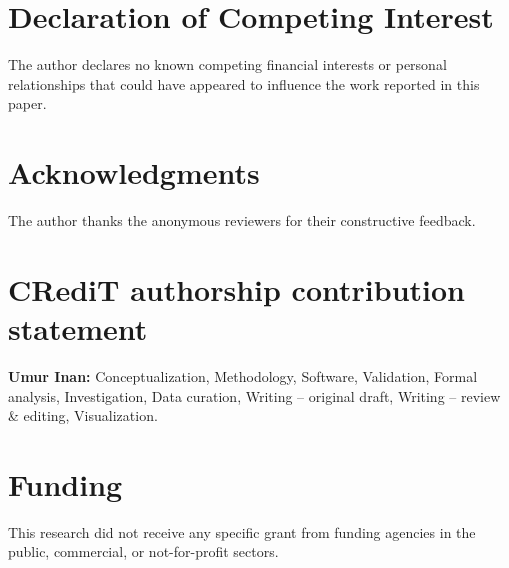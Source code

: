 \documentclass[preprint,review,12pt]{elsarticle}
\begin{document}
\section*{Declaration of Competing Interest}

The author declares no known competing financial interests or personal relationships that could have appeared to influence the work reported in this paper.

\section*{Acknowledgments}

The author thanks the anonymous reviewers for their constructive feedback.

\section*{CRediT authorship contribution statement}

\textbf{Umur Inan:} Conceptualization, Methodology, Software, Validation, Formal analysis, Investigation, Data curation, Writing -- original draft, Writing -- review \& editing, Visualization.

\section*{Funding}

This research did not receive any specific grant from funding agencies in the public, commercial, or not-for-profit sectors.






\end{document}
